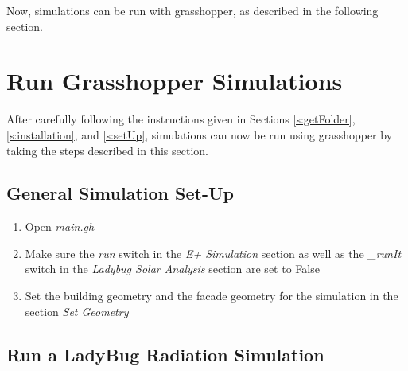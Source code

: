 	Now, simulations can be run with grasshopper, as described in the following section.

\section{Run Grasshopper Simulations}
\label{s:runGH}

	After carefully following the instructions given in Sections \ref{s:getFolder}, \ref{s:installation}, and \ref{s:setUp}, simulations can now be run using grasshopper by taking the steps described in this section.

	\subsection{General Simulation Set-Up}

	\begin{enumerate}

	\item Open \emph{main.gh}

	\item Make sure the \emph{run} switch in the \emph{E+ Simulation} section as well as the \emph{\_runIt} switch in the \emph{Ladybug Solar Analysis} section are set to False 

	\item Set the building geometry and the facade geometry for the simulation in the section \emph{Set Geometry}
	\end{enumerate}

	\subsection{Run a LadyBug Radiation Simulation}


